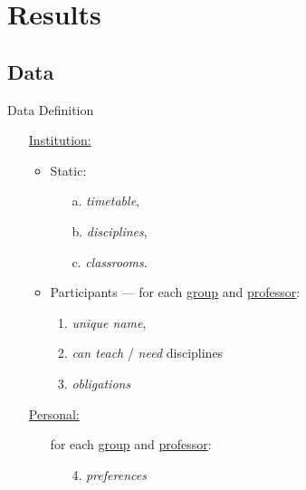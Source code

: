 \section{Results}

\subsection{Data}

\begin{frame}{Data Definition}
  \begin{mdframed}[leftmargin=1cm, hidealllines=true]
    \begin{itemize}
      \item[\underline{Institution:}]
        \begin{itemize}
          \item Static:
                \begin{enumerate}
                  \item[a.] \emph{timetable},
                  \item[b.] \emph{disciplines},
                  \item[c.] \emph{classrooms}.
                \end{enumerate}
          \item Participants --- for each \underline{group} and \underline{professor}:\\
                \begin{enumerate}
                  \item \emph{unique name},
                  \item \emph{can teach} / \emph{need} disciplines
                  \item \emph{obligations}
                \end{enumerate}
        \end{itemize}
      \item[\underline{Personal:}]
        \begin{itemize}
          \item[] for each \underline{group} and \underline{professor}:
          \begin{enumerate}
            \item[4.] \emph{preferences}
          \end{enumerate}
        \end{itemize}
    \end{itemize}
  \end{mdframed}
\end{frame}

